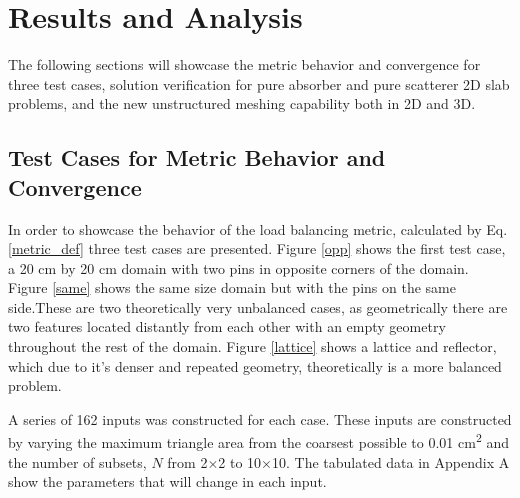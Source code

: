 \documentclass{anstrans}
\begin{document}
\section{Results and Analysis}

The following sections will showcase the metric behavior and convergence for three test cases, solution verification for pure absorber and pure scatterer 2D slab problems, and the new unstructured meshing capability both in 2D and 3D.

\subsection{Test Cases for Metric Behavior and Convergence}
\label{sec:convergence}
In order to showcase the behavior of the load balancing metric, calculated by Eq. \ref{metric_def} three test cases are presented. Figure \ref{opp} shows the first test case, a 20 cm by 20 cm domain with two pins in opposite corners of the domain. Figure \ref{same} shows the same size domain but with the pins on the same side.These are two theoretically very unbalanced cases, as geometrically there are two features located distantly from each other with an empty geometry throughout the rest of the domain. Figure \ref{lattice} shows a lattice and reflector, which due to it's denser and repeated geometry, theoretically is a more balanced problem. 

A series of 162 inputs was constructed for each case. These inputs are constructed by varying the maximum triangle area from the coarsest possible to 0.01 cm\textsuperscript{2} and the number of subsets, $N$ from 2$\times$2 to 10$\times$10. The tabulated data in Appendix A show the parameters that will change in each input. 
\end{document}
